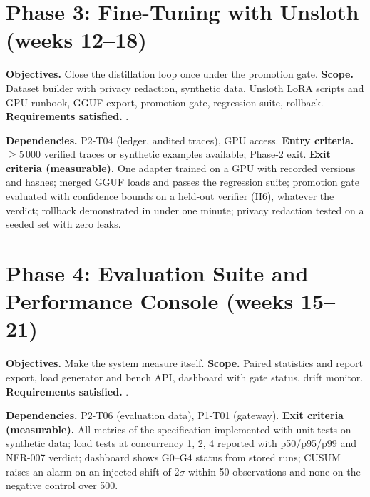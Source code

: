 \documentclass[11pt,a4paper]{article}
\begin{document}
\section{Phase 3: Fine-Tuning with Unsloth (weeks 12--18)}
\textbf{Objectives.} Close the distillation loop once under the promotion gate. \textbf{Scope.} Dataset builder with privacy redaction, synthetic data, Unsloth LoRA scripts and GPU runbook, GGUF export, promotion gate, regression suite, rollback. \textbf{Requirements satisfied.} \ReqsPhaseD.
\par\medskip\noindent\TasksPhaseD
\par\medskip\noindent\textbf{Dependencies.} P2-T04 (ledger, audited traces), GPU access. \textbf{Entry criteria.} $\ge5\,000$ verified traces or synthetic examples available; Phase-2 exit. \textbf{Exit criteria (measurable).} One adapter trained on a GPU with recorded versions and hashes; merged GGUF loads and passes the regression suite; promotion gate evaluated with confidence bounds on a held-out verifier (H6), whatever the verdict; rollback demonstrated in under one minute; privacy redaction tested on a seeded set with zero leaks.

\section{Phase 4: Evaluation Suite and Performance Console (weeks 15--21)}
\textbf{Objectives.} Make the system measure itself. \textbf{Scope.} Paired statistics and report export, load generator and bench API, dashboard with gate status, drift monitor. \textbf{Requirements satisfied.} \ReqsPhaseE.
\par\medskip\noindent\TasksPhaseE
\par\medskip\noindent\textbf{Dependencies.} P2-T06 (evaluation data), P1-T01 (gateway). \textbf{Exit criteria (measurable).} All metrics of the specification implemented with unit tests on synthetic data; load tests at concurrency 1, 2, 4 reported with p50/p95/p99 and NFR-007 verdict; dashboard shows G0--G4 status from stored runs; CUSUM raises an alarm on an injected shift of $2\sigma$ within 50 observations and none on the negative control over 500.
\end{document}
